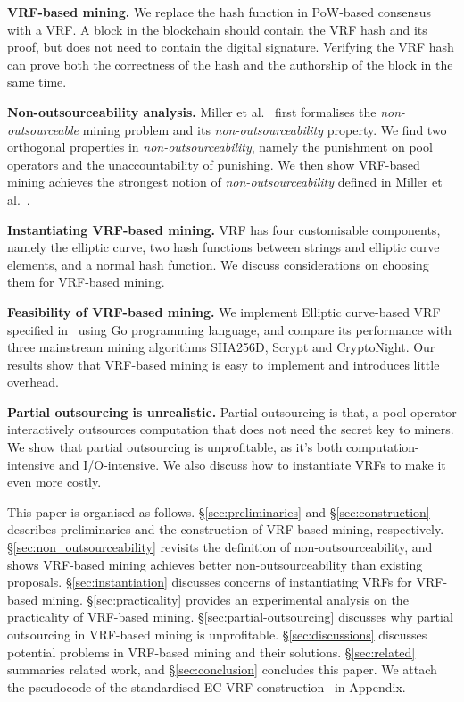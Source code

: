 \textbf{VRF-based mining.} 
We replace the hash function in PoW-based consensus with a VRF.
A block in the blockchain should contain the VRF hash and its proof, but does not need to contain the digital signature.
Verifying the VRF hash can prove both the correctness of the hash and the authorship of the block in the same time.

\textbf{Non-outsourceability analysis.}
Miller et al.~\cite{miller2015nonoutsourceable} first formalises the \emph{non-outsourceable} mining problem and its \emph{non-outsourceability} property.
We find two orthogonal properties in \emph{non-outsourceability}, namely the punishment on pool operators and the unaccountability of punishing.
We then show VRF-based mining achieves the strongest notion of \emph{non-outsourceability} defined in Miller et al.~\cite{miller2015nonoutsourceable}.

\textbf{Instantiating VRF-based mining.}
VRF has four customisable components, namely the elliptic curve, two hash functions between strings and elliptic curve elements, and a normal hash function.
We discuss considerations on choosing them for VRF-based mining.

\textbf{Feasibility of VRF-based mining.}
We implement Elliptic curve-based VRF specified in~\cite{goldberg2017draft} using Go programming language, and compare its performance with three mainstream mining algorithms SHA256D, Scrypt and CryptoNight.
Our results show that VRF-based mining is easy to implement and introduces little overhead.

\textbf{Partial outsourcing is unrealistic.}
Partial outsourcing is that, a pool operator interactively outsources computation that does not need the secret key to miners.
We show that partial outsourcing is unprofitable, as it's both computation-intensive and I/O-intensive.
We also discuss how to instantiate VRFs to make it even more costly.

This paper is organised as follows.
\S\ref{sec:preliminaries} and \S\ref{sec:construction} describes preliminaries and the construction of VRF-based mining, respectively.
\S\ref{sec:non_outsourceability} revisits the definition of non-outsourceability, and shows VRF-based mining achieves better non-outsourceability than existing proposals.
\S\ref{sec:instantiation} discusses concerns of instantiating VRFs for VRF-based mining.
\S\ref{sec:practicality} provides an experimental analysis on the practicality of VRF-based mining.
\S\ref{sec:partial-outsourcing} discusses why partial outsourcing in VRF-based mining is unprofitable.
\S\ref{sec:discussions} discusses potential problems in VRF-based mining and their solutions.
\S\ref{sec:related} summaries related work, and \S\ref{sec:conclusion} concludes this paper.
We attach the pseudocode of the standardised EC-VRF construction~\cite{goldberg2017draft} in Appendix.
